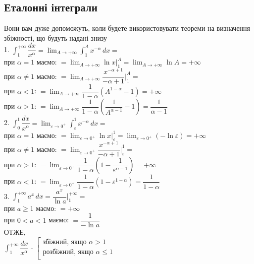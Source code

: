 \documentclass[a4paper, 14pt]{extarticle}
\def\huge{\displaystyle}
\def\bigline{\vspace{5mm}\\}
\theoremstyle{theoremdd}
\theoremstyle{theoremdd}
\theoremstyle{theoremdd}
\theoremstyle{theoremdd}
\theoremstyle{theoremdd}
\theoremstyle{theoremdd}
\theoremstyle{theoremdd}
\theoremstyle{theoremdd}
\begin{document}
\subsection{Еталонні інтеграли}
Вони вам дуже допоможуть, коли будете використовувати теореми на визначення збіжності, що будуть надані знизу\\
1. $\huge\int_1^{+\infty} \dfrac{dx}{x^\alpha} = \huge\lim_{A \to +\infty} \int_1^A x^{-\alpha} \,dx =$\\
при $\alpha = 1$ маємо: $= \huge\lim_{A \to +\infty} \ln x \Big|_1^A = \lim_{A \to +\infty} \ln A = +\infty$\\
при $\alpha \neq 1$ маємо: $= \huge\lim_{A \to +\infty} \dfrac{x^{-\alpha+1}}{-\alpha+1} \Big|_1^A =$\\
\text{ } \hspace{0.4cm} при $\alpha < 1$: $= \huge\lim_{A \to +\infty} \dfrac{1}{1-\alpha} (A^{1-\alpha} - 1) = +\infty$\\
\text{ } \hspace{0.4cm} при $\alpha > 1$: $= \huge\lim_{A \to +\infty} \dfrac{1}{1-\alpha} (\dfrac{1}{A^{\alpha-1}} - 1) = \dfrac{1}{\alpha - 1}$
\bigline
2. $\huge\int_0^1 \dfrac{dx}{x^{\alpha}} = \huge\lim_{\varepsilon \to 0^+} \int_\varepsilon^1 x^{-\alpha}\,dx = $\\
при $\alpha = 1$ маємо: $= \huge\lim_{\varepsilon \to 0^+} \ln x \Big|_\varepsilon^1 = \lim_{\varepsilon \to 0^+} (-\ln \varepsilon) = +\infty$\\
при $\alpha \neq 1$ маємо: $= \huge\lim_{\varepsilon \to 0^+} \dfrac{x^{-\alpha+1}}{-\alpha+1} \Big|_\varepsilon^1 =$\\
\text{ } \hspace{0.4cm} при $\alpha > 1$: $= \huge\lim_{\varepsilon \to 0^+} \dfrac{1}{1-\alpha} (1 - \dfrac{1}{\varepsilon^{\alpha-1}}) = +\infty$\\
\text{ } \hspace{0.4cm} при $\alpha < 1$: $= \huge\lim_{\varepsilon \to 0^+} \dfrac{1}{1-\alpha} (1 - \varepsilon^{1-\alpha}) = \dfrac{1}{1-\alpha}$
\bigline
3. $\huge\int_1^{+\infty} a^x\,dx = \dfrac{a^x}{\ln a} \Big|_1^{+\infty} =$\\
при $a \geq 1$ маємо: $= +\infty$\\
при $0 < a < 1$ маємо: $= \dfrac{1}{-\ln a}$
\bigline
ОТЖЕ,\\
$\huge\int_1^{+\infty} \dfrac{dx}{x^\alpha}$ - $\left[ \begin{gathered} \text{збіжний, якщо } \alpha > 1 \\ \text{розбіжний, якщо } \alpha \leq 1 \\ \end{gathered} \right.$\\
\end{document}
